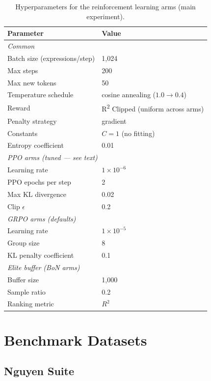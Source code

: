 \begin{table}[htbp]
    \centering
    \caption{Hyperparameters for the reinforcement learning arms (main experiment).}
    \label{tab:rl_hyperparams}
    \begin{tabular}{ll}
    \toprule
    \textbf{Parameter} & \textbf{Value} \\
    \midrule
    \multicolumn{2}{l}{\textit{Common}} \\
    Batch size (expressions/step) & 1{,}024 \\
    Max steps & 200 \\
    Max new tokens & 50 \\
    Temperature schedule & cosine annealing ($1.0 \rightarrow 0.4$) \\
    Reward & R\textsuperscript{2} Clipped (uniform across arms) \\
    Penalty strategy & gradient \\
    Constants & $C=1$ (no fitting) \\
    Entropy coefficient & 0.01 \\
    \midrule
    \multicolumn{2}{l}{\textit{PPO arms (tuned --- see text)}} \\
    Learning rate & $1 \times 10^{-6}$ \\
    PPO epochs per step & 2 \\
    Max KL divergence & 0.02 \\
    Clip $\epsilon$ & 0.2 \\
    \midrule
    \multicolumn{2}{l}{\textit{GRPO arms (defaults)}} \\
    Learning rate & $1 \times 10^{-5}$ \\
    Group size & 8 \\
    KL penalty coefficient & 0.1 \\
    \midrule
    \multicolumn{2}{l}{\textit{Elite buffer (BoN arms)}} \\
    Buffer size & 1{,}000 \\
    Sample ratio & 0.2 \\
    Ranking metric & $R^2$ \\
    \bottomrule
    \end{tabular}
\end{table}

\section{Benchmark Datasets}
\label{sec:benchmarks}

\subsection{Nguyen Suite}

